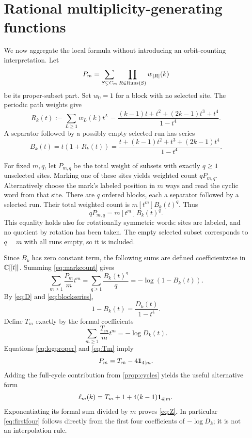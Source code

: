\section{Rational multiplicity-generating functions}\label{sec:series}

We now aggregate the local formula without introducing an orbit-counting
interpretation. Let
\[
 P_m=\sum_{S\subsetneq C_m}\prod_{R\in\operatorname{Runs}(S)}w_{|R|}(k)
\]
be its proper-subset part. Set $w_0=1$ for a block with no selected site.
The periodic path weights give
\begin{equation}\label{eq:runseries}
 R_k(t):=\sum_{L\geq1}w_L(k)t^L
 =\frac{(k-1)t+t^2+(2k-1)t^3+t^4}{1-t^4}.
\end{equation}
A separator followed by a possibly empty selected run has series
\begin{equation}\label{eq:blockseries}
 B_k(t)=t(1+R_k(t))
 =\frac{t+(k-1)t^2+t^3+(2k-1)t^4}{1-t^4}.
\end{equation}

For fixed $m,q$, let $P_{m,q}$ be the total weight of subsets with exactly
$q\geq1$ unselected sites. Marking one of these sites yields weighted
count $qP_{m,q}$. Alternatively choose the mark's labeled position in
$m$ ways and read the cyclic word from that site. There are $q$ ordered
blocks, each a separator followed by a selected run. Their total weighted
count is $m[t^m]B_k(t)^q$. Thus
\begin{equation}\label{eq:markcount}
 qP_{m,q}=m[t^m]B_k(t)^q.
\end{equation}
This equality holds also for rotationally symmetric words: sites are
labeled, and no quotient by rotation has been taken. The empty selected
subset corresponds to $q=m$ with all runs empty, so it is included.

Since $B_k$ has zero constant term, the following sums are defined
coefficientwise in $\mathbb C[[t]]$. Summing \eqref{eq:markcount} gives
\begin{equation}\label{eq:logproper}
 \sum_{m\geq1}\frac{P_m}{m}t^m
 =\sum_{q\geq1}\frac{B_k(t)^q}{q}
 =-\log(1-B_k(t)).
\end{equation}
By \eqref{eq:D} and \eqref{eq:blockseries},
\[
 1-B_k(t)=\frac{D_k(t)}{1-t^4}.
\]
Define $T_m$ exactly by the formal coefficients
\begin{equation}\label{eq:Tm}
 \sum_{m\geq1}\frac{T_m}{m}t^m=-\log D_k(t).
\end{equation}
Equations \eqref{eq:logproper} and \eqref{eq:Tm} imply
\[
 P_m=T_m-4\mathbf 1_{4\mid m}.
\]
Adding the full-cycle contribution from \cref{prop:cycles} yields the
useful alternative form
\begin{equation}\label{eq:traceform}
 \ell_m(k)=T_m+1+4(k-1)\mathbf 1_{4\mid m}.
\end{equation}
Exponentiating its formal sum divided by $m$ proves \eqref{eq:Z}.
In particular \eqref{eq:firstfour} follows directly from the first four
coefficients of $-\log D_k$; it is not an interpolation rule.

